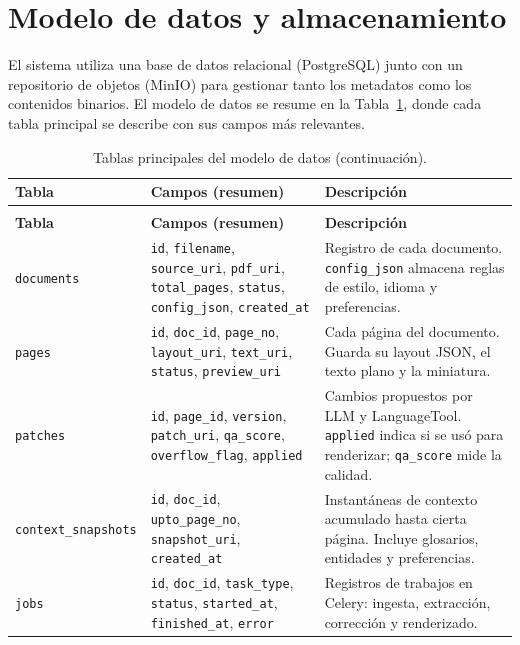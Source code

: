 \documentclass[12pt]{article}
\begin{document}
\section{Modelo de datos y almacenamiento}

El sistema utiliza una base de datos relacional (PostgreSQL) junto con un repositorio de objetos
(MinIO) para gestionar tanto los metadatos como los contenidos binarios.  El modelo de datos se
resume en la Tabla~\ref{tab:datos}, donde cada tabla principal se describe con sus campos más
relevantes.

\begin{longtable}{>{\raggedright\arraybackslash}p{3cm}p{4.5cm}p{6.5cm}}
  \caption{Tablas principales del modelo de datos.}\label{tab:datos}\\
  \toprule
  \textbf{Tabla} & \textbf{Campos (resumen)} & \textbf{Descripción} \\
  \midrule
  \endfirsthead
  \caption[]{Tablas principales del modelo de datos (continuación).}\\
  \toprule
  \textbf{Tabla} & \textbf{Campos (resumen)} & \textbf{Descripción} \\
  \midrule
  \endhead
  \bottomrule
  \endfoot
  \texttt{documents} & \texttt{id}, \texttt{filename}, \texttt{source\_uri}, \texttt{pdf\_uri}, \texttt{total\_pages}, \texttt{status}, \texttt{config\_json}, \texttt{created\_at} & Registro de cada documento. \texttt{config\_json} almacena reglas de estilo, idioma y preferencias. \\
  \addlinespace
  \texttt{pages} & \texttt{id}, \texttt{doc\_id}, \texttt{page\_no}, \texttt{layout\_uri}, \texttt{text\_uri}, \texttt{status}, \texttt{preview\_uri} & Cada página del documento. Guarda su layout JSON, el texto plano y la miniatura. \\
  \addlinespace
  \texttt{patches} & \texttt{id}, \texttt{page\_id}, \texttt{version}, \texttt{patch\_uri}, \texttt{qa\_score}, \texttt{overflow\_flag}, \texttt{applied} & Cambios propuestos por LLM y LanguageTool. \texttt{applied} indica si se usó para renderizar; \texttt{qa\_score} mide la calidad. \\
  \addlinespace
  \texttt{context\_snapshots} & \texttt{id}, \texttt{doc\_id}, \texttt{upto\_page\_no}, \texttt{snapshot\_uri}, \texttt{created\_at} & Instantáneas de contexto acumulado hasta cierta página.  Incluye glosarios, entidades y preferencias. \\
  \addlinespace
  \texttt{jobs} & \texttt{id}, \texttt{doc\_id}, \texttt{task\_type}, \texttt{status}, \texttt{started\_at}, \texttt{finished\_at}, \texttt{error} & Registros de trabajos en Celery: ingesta, extracción, corrección y renderizado. \\
\end{longtable}
\end{document}
